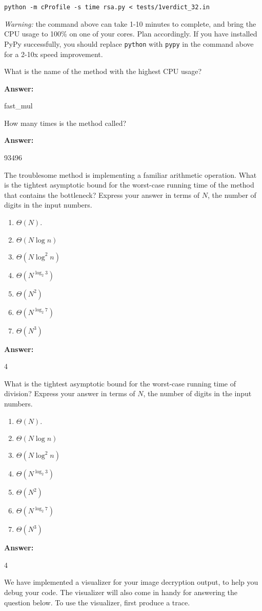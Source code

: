 \documentclass[12pt,twoside]{article}
\newcommand{\answer}{
 \par\medskip
 \textbf{Answer:}
}
\newcommand{\answerIIIa}{ \answer 
fast\_mul
}
\newcommand{\answerIIIb}{ \answer
93496
}
\newcommand{\answerIIIc}{ \answer
4
}
\newcommand{\answerIIId}{ \answer
4
}
\begin{document}
\begin{problems}
\begin{problemparts}
\texttt{python -m cProfile -s time rsa.py < tests/1verdict\_32.in}

\textit{Warning:} the command above can take 1-10 minutes to complete, and
bring the CPU usage to 100\% on one of your cores. Plan accordingly. If
you have installed PyPy successfully, you should replace \texttt{python} with
\texttt{pypy} in the command above for a 2-10x speed improvement. 

What is the name of the method with the highest CPU usage?
\answerIIIa

\problempart {} How many times is the method called?
\answerIIIb

\problempart {} The troublesome method is implementing a familiar
arithmetic operation. What is the tightest asymptotic bound for the worst-case
running time of the method that contains the bottleneck? Express your answer in
terms of $N$, the number of digits in the input numbers.
\begin{enumerate}
  \item $\Theta(N)$.
  \item $\Theta(N \log n)$
  \item $\Theta(N \log^2 n)$
  \item $\Theta(N^{\log_{2} 3})$
  \item $\Theta(N^2)$
  \item $\Theta(N^{\log_{2} 7})$
  \item $\Theta(N^3)$
\end{enumerate}
\answerIIIc

\problempart {} What is the tightest asymptotic bound for the worst-case
running time of division? Express your answer in terms of $N$, the number of
digits in the input numbers.
\begin{enumerate}
  \item $\Theta(N)$.
  \item $\Theta(N \log n)$
  \item $\Theta(N \log^2 n)$
  \item $\Theta(N^{\log_{2} 3})$
  \item $\Theta(N^2)$
  \item $\Theta(N^{\log_{2} 7})$
  \item $\Theta(N^3)$
\end{enumerate}
\answerIIId

\end{problemparts}

We have implemented a visualizer for your image decryption output, to help you
debug your code. The visualizer will also come in handy for answering the
question below. To use the visualizer, first produce a trace.


\end{problems}
\end{document}
